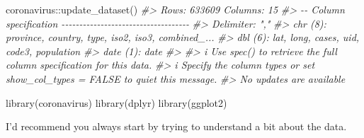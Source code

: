 \documentclass[
]{book}
\newenvironment{Shaded}{\begin{snugshade}}{\end{snugshade}}
\newcommand{\CommentTok}[1]{\textcolor[rgb]{0.56,0.35,0.01}{\textit{#1}}}
\newcommand{\FunctionTok}[1]{\textcolor[rgb]{0.00,0.00,0.00}{#1}}
\newcommand{\NormalTok}[1]{#1}
\newcommand{\SpecialCharTok}[1]{\textcolor[rgb]{0.00,0.00,0.00}{#1}}
\begin{document}
\begin{Shaded}
\begin{Highlighting}[]
\NormalTok{coronavirus}\SpecialCharTok{::}\FunctionTok{update\_dataset}\NormalTok{()}
\CommentTok{\#\textgreater{} Rows: 633609 Columns: 15}
\CommentTok{\#\textgreater{} {-}{-} Column specification {-}{-}{-}{-}{-}{-}{-}{-}{-}{-}{-}{-}{-}{-}{-}{-}{-}{-}{-}{-}{-}{-}{-}{-}{-}{-}{-}{-}{-}{-}{-}{-}{-}{-}{-}{-}}
\CommentTok{\#\textgreater{} Delimiter: ","}
\CommentTok{\#\textgreater{} chr  (8): province, country, type, iso2, iso3, combined\_...}
\CommentTok{\#\textgreater{} dbl  (6): lat, long, cases, uid, code3, population}
\CommentTok{\#\textgreater{} date (1): date}
\CommentTok{\#\textgreater{} }
\CommentTok{\#\textgreater{} i Use \textasciigrave{}spec()\textasciigrave{} to retrieve the full column specification for this data.}
\CommentTok{\#\textgreater{} i Specify the column types or set \textasciigrave{}show\_col\_types = FALSE\textasciigrave{} to quiet this message.}
\CommentTok{\#\textgreater{} No updates are available}
\end{Highlighting}
\end{Shaded}

\begin{Shaded}
\begin{Highlighting}[]
\FunctionTok{library}\NormalTok{(coronavirus)}
\FunctionTok{library}\NormalTok{(dplyr)}
\FunctionTok{library}\NormalTok{(ggplot2)}
\end{Highlighting}
\end{Shaded}

I'd recommend you always start by trying to understand a bit about the data.
\end{document}
